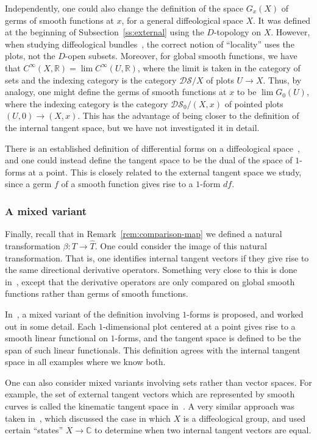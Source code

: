 \documentclass{amsart}
\theoremstyle{remark}
\newcommand{\DS}{{\mathcal{DS}}}
\def \C{\mathbb{C}}
\def \R{\mathbb{R}}
\begin{document}
Independently, one could also change the definition of the space $G_x(X)$
of germs of smooth functions at $x$, for a general diffeological space $X$.
It was defined at the beginning of Subsection~\ref{ss:external} using the
$D$-topology on $X$.
However, when studying diffeological bundles~\cite{I1}, the correct notion
of ``locality'' uses the plots, not the $D$-open subsets.
Moreover, for global smooth functions, we have that
$C^{\infty}(X, \R) = \lim C^{\infty}(U, \R)$,
where the limit is taken in the category of sets and the indexing category
is the category $\DS/X$ of plots $U \to X$.
Thus, by analogy, one might define the germs of smooth functions at $x$ to be
$\lim G_0(U)$,
where the indexing category is the category $\DS_0/(X,x)$ of pointed plots
$(U,0) \to (X,x)$.
This has the advantage of being closer to the definition of the internal tangent
space, but we have not investigated it in detail.

There is an established definition of differential forms on a
diffeological space~\cite{I3}, and one could instead define the
tangent space to be the dual of the space of $1$-forms at a point.
This is closely related to the external tangent space we study,
since a germ $f$ of a smooth function gives rise to a $1$-form $df$.

\subsubsection{A mixed variant}

Finally, recall that in Remark~\ref{rem:comparison-map} we defined a
natural transformation $\beta : T \to \hat{T}$.
One could consider the image of this natural transformation.
That is, one identifies internal tangent vectors if they give rise
to the same directional derivative operators.
%
%
Something very close to this is done in~\cite{V}, except that
the derivative operators are only compared on global smooth functions
rather than germs of smooth functions.

In~\cite{I3}, a mixed variant of the definition involving
$1$-forms is proposed, and worked out in some detail.
Each $1$-dimensional plot centered at a point gives rise to a smooth
linear functional on $1$-forms, and the tangent space is defined to
be the span of such linear functionals.
This definition agrees with the internal tangent space in all examples
where we know both.

One can also consider mixed variants involving sets rather than
vector spaces.  For example, the set of external tangent
vectors which are represented by smooth curves is called the
kinematic tangent space in~\cite{St2}.
%
%
A very similar approach was taken in~\cite{So1}, which discussed
the case in which $X$ is a diffeological group, and used certain ``states''
$X \to \C$ to determine when two internal tangent vectors are equal.
\end{document}
